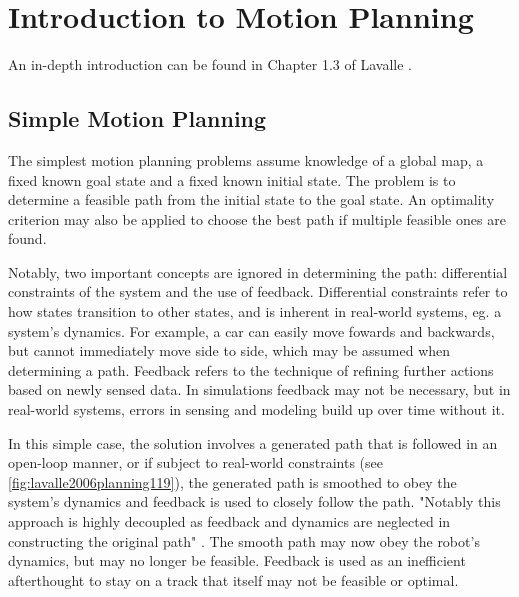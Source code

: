 \section{Introduction to Motion Planning}
An in-depth introduction can be found in Chapter 1.3 of Lavalle
\cite{lavalle2006planning}.

\subsection{Simple Motion Planning}
The simplest motion planning problems assume knowledge of a global map, a fixed
known goal state and a fixed known initial state. The problem is to determine a
feasible path from the initial state to the goal state. An optimality criterion
may also be applied to choose the best path if multiple feasible ones are found.

Notably, two important concepts are ignored in determining the path:
differential constraints of the system and the use of feedback. Differential
constraints refer to how states transition to other states, and is inherent in
real-world systems, eg. a system's dynamics. For example, a car can easily move
fowards and backwards, but cannot immediately move side to side, which may be
assumed when determining a path. Feedback refers to the technique of refining
further actions based on newly sensed data. In simulations feedback may not be
necessary, but in real-world systems, errors in sensing and modeling build up
over time without it.

In this simple case, the solution involves a generated path that is followed in
an open-loop manner, or if subject to real-world constraints (see
\autoref{fig:lavalle2006planning119}), the generated path is smoothed to obey
the system's dynamics and feedback is used to closely follow the path. "Notably
this approach is highly decoupled as feedback and dynamics are neglected in
constructing the original path" \cite{lavalle2006planning}. The smooth path may
now obey the robot's dynamics, but may no longer be feasible. Feedback is used
as an inefficient afterthought to stay on a track that itself may not be
feasible or optimal.

